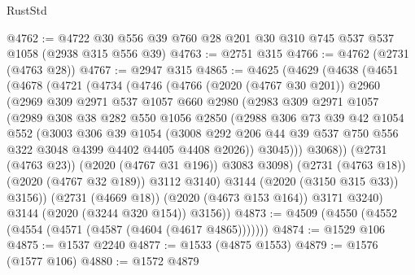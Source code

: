 \begin{lexlean}{RustStd}
\begin{coremodule}
@4762 := @4722 @30 @556 @39 @760 @28 @201 @30 @310 @745 @537 @537 @1058 (@2938 @315 @556 @39)
@4763 := @2751 @315
@4766 := @4762 (@2731 (@4763 @28))
@4767 := @2947 @315
@4865 := @4625
    (@4629
      (@4638
        (@4651
          (@4678
            (@4721
              (@4734
                (@4746
                  (@4766
                    (@2020 (@4767 @30 @201))
                    @2960
                    (@2969
                      @309
                      @2971
                      @537
                      @1057
                      @660
                      @2980
                      (@2983
                        @309
                        @2971
                        @1057
                        (@2989
                          @308
                          @38
                          @282
                          @550
                          @1056
                          @2850
                          (@2988
                            @306
                            @73
                            @39
                            @42
                            @1054
                            @552
                            (@3003
                              @306
                              @39
                              @1054
                              (@3008
                                @292
                                @206
                                @44
                                @39
                                @537
                                @750
                                @556
                                @322
                                @3048
                                @4399
                                @4402
                                @4405
                                @4408
                                @2026))
                            @3045)))
                      @3068))
                  (@2731 (@4763 @23))
                  (@2020 (@4767 @31 @196))
                  @3083
                  @3098)
                (@2731 (@4763 @18))
                (@2020 (@4767 @32 @189))
                @3112
                @3140)
              @3144
              (@2020 (@3150 @315 @33))
              @3156))
          (@2731 (@4669 @18))
          (@2020 (@4673 @153 @164))
          @3171
          @3240)
        @3144
        (@2020 (@3244 @320 @154))
        @3156))
@4873 := @4509 (@4550 (@4552 (@4554 (@4571 (@4587 (@4604 (@4617 @4865)))))))
@4874 := @1529 @106
@4875 := @1537 @2240
@4877 := @1533 (@4875 @1553)
@4879 := @1576 (@1577 @106)
@4880 := @1572 @4879

\end{coremodule}
\end{lexlean}
